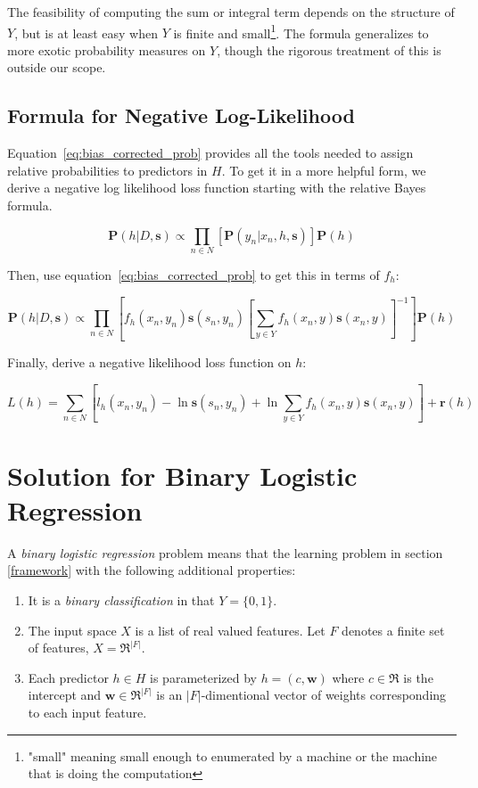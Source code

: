 \documentclass[twoside]{article}
\begin{document}
The feasibility of computing the sum or integral term depends on the structure of \(Y\), but is at least easy when \(Y\) is finite and small\footnote{"small" meaning small enough to enumerated by a machine or the machine that is doing the computation}. The formula generalizes to more exotic probability measures on \(Y\), though the rigorous treatment of this is outside our scope.

\subsection{Formula for Negative Log-Likelihood}

Equation~\eqref{eq:bias_corrected_prob} provides all the tools needed to assign relative probabilities to predictors in \(H\). To get it in a more helpful form, we derive a negative log likelihood loss function starting with the relative Bayes formula.

\[\mathbf{P}(h|D,\mathbf{s})\propto\prod_{n \in N} \left[\mathbf{P}(y_n|x_n,h,\mathbf{s})\right]\mathbf{P}(h)\]

Then, use equation~\eqref{eq:bias_corrected_prob} to get this in terms of \(f_h\):

\[\mathbf{P}(h|D,\mathbf{s})\propto\prod_{n \in N} \left[f_h(x_n,y_n)\mathbf{s}(s_n,y_n)\left [\sum_{y \in Y}f_h(x_n,y)\mathbf{s}(x_n,y) \right ]^{-1} \right]\mathbf{P}(h)\]

Finally, derive a negative likelihood loss function on \(h\):

\[L(h)= \sum_{n \in N} \left[l_h(x_n,y_n)-\ln\mathbf{s}(s_n,y_n)+\ln\sum_{y \in Y}f_h(x_n,y)\mathbf{s}(x_n,y) \right] +\mathbf{r}(h)\]

\section{Solution for Binary Logistic Regression}
\label{section:logistic}

A \textit{binary logistic regression} problem means that the learning problem in section \ref{framework} with the following additional properties:
\begin{enumerate}
	\item It is a \textit{binary classification} in that \(Y = \{0, 1\}\).
	\item The input space \(X\) is a list of real valued features. Let \(F\) denotes a finite set of features, \(X = \Re ^{|F|}\).
	\item Each predictor \(h \in H\) is parameterized by \(h = (c, \mathbf{w})\) where \(c \in \Re\) is the intercept and \(\mathbf{w} \in \Re ^{|F|}\) is an \(|F|\)-dimentional vector of weights corresponding to each input feature.
\end{enumerate}
\end{document}
